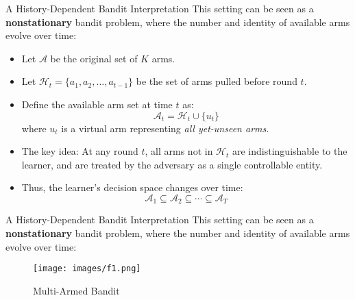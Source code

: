 \documentclass{beamer}
\begin{document}
\begin{frame}{A History-Dependent Bandit Interpretation}
    This setting can be seen as a \textbf{nonstationary} bandit problem, where the number and identity of available arms evolve over time:

    \begin{itemize}
        \item Let $\mathcal{A}$ be the original set of $K$ arms.
        \item Let $\mathcal{H}_t = \{a_1, a_2, \dots, a_{t-1}\}$ be the set of arms pulled before round $t$.
        \item Define the available arm set at time $t$ as:
        \[
            \mathcal{A}_t = \mathcal{H}_t \cup \{u_t\}
        \]
        where $u_t$ is a virtual arm representing \emph{all yet-unseen arms}.

        \item The key idea: At any round $t$, all arms not in $\mathcal{H}_t$ are indistinguishable to the learner, and are treated by the adversary as a single controllable entity.

        \item Thus, the learner's decision space changes over time:
        \[
            \mathcal{A}_1 \subseteq \mathcal{A}_2 \subseteq \cdots \subseteq \mathcal{A}_T
        \]
    \end{itemize}
\end{frame}


\begin{frame}{A History-Dependent Bandit Interpretation}
    This setting can be seen as a \textbf{nonstationary} bandit problem, where the number and identity of available arms evolve over time:

    \begin{figure}
        \centering
        \texttt{[image: images/f1.png]}
        \caption{Multi-Armed Bandit}
    \end{figure}
\end{frame}


\end{document}
